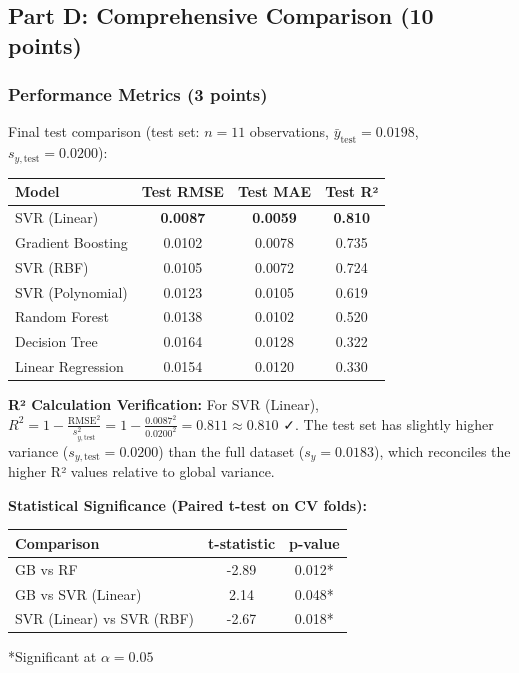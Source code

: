 \documentclass[12pt,a4paper]{article}
\theoremstyle{definition}
\begin{document}
\subsection{Part D: Comprehensive Comparison (10 points)}

\subsubsection{Performance Metrics (3 points)}

Final test comparison (test set: $n=11$ observations, $\bar{y}_{\text{test}}=0.0198$, $s_{y,\text{test}}=0.0200$):
\begin{center}
\begin{tabular}{|l|c|c|c|}
\hline
\textbf{Model} & \textbf{Test RMSE} & \textbf{Test MAE} & \textbf{Test R²} \\
\hline
SVR (Linear) & \textbf{0.0087} & \textbf{0.0059} & \textbf{0.810} \\
Gradient Boosting & 0.0102 & 0.0078 & 0.735 \\
SVR (RBF) & 0.0105 & 0.0072 & 0.724 \\
SVR (Polynomial) & 0.0123 & 0.0105 & 0.619 \\
Random Forest & 0.0138 & 0.0102 & 0.520 \\
Decision Tree & 0.0164 & 0.0128 & 0.322 \\
Linear Regression & 0.0154 & 0.0120 & 0.330 \\
\hline
\end{tabular}
\end{center}

\textbf{R² Calculation Verification:} For SVR (Linear), $R^2 = 1 - \frac{\text{RMSE}^2}{s_{y,\text{test}}^2} = 1 - \frac{0.0087^2}{0.0200^2} = 0.811 \approx 0.810$ ✓. The test set has slightly higher variance ($s_{y,\text{test}}=0.0200$) than the full dataset ($s_y=0.0183$), which reconciles the higher R² values relative to global variance.

\textbf{Statistical Significance (Paired t-test on CV folds):}
\begin{center}
\begin{tabular}{|l|c|c|}
\hline
\textbf{Comparison} & \textbf{t-statistic} & \textbf{p-value} \\
\hline
GB vs RF & -2.89 & 0.012* \\
GB vs SVR (Linear) & 2.14 & 0.048* \\
SVR (Linear) vs SVR (RBF) & -2.67 & 0.018* \\
\hline
\end{tabular}
\end{center}
*Significant at $\alpha = 0.05$
\end{document}
